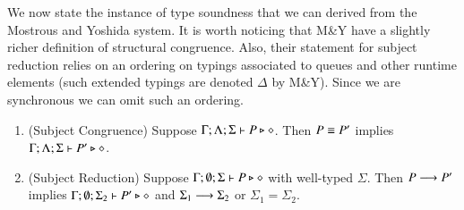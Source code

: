 We now state the instance of type soundness that we can derived from the Mostrous and Yoshida system.
It is worth noticing that M\&Y have a slightly richer definition of structural congruence.
Also, their statement for subject reduction relies on an ordering on typings associated to queues and other 
runtime elements (such extended typings are denoted $\Delta$ by M\&Y).
Since we are synchronous we can omit such an ordering.

\begin{theorem}\label{t:sr}
	\begin{enumerate}[1.]
		\item	(Subject Congruence) Suppose $\Gamma; \Lambda; \Sigma \vdash P \triangleright \diamond$.
			Then $P \equiv P'$ implies $\Gamma; \Lambda; \Sigma \vdash P' \triangleright \diamond$.

		\item	(Subject Reduction) Suppose $\Gamma; \emptyset; \Sigma \vdash P \triangleright \diamond$
			with
			well-typed $\Sigma$.
			Then $P \longrightarrow P'$ implies $\Gamma; \emptyset; \Sigma_2  \vdash P' \triangleright \diamond$
			and $\Sigma_1 \longrightarrow \Sigma_2$ or $\Sigma_1 = \Sigma_2$.
	\end{enumerate}
\end{theorem}

